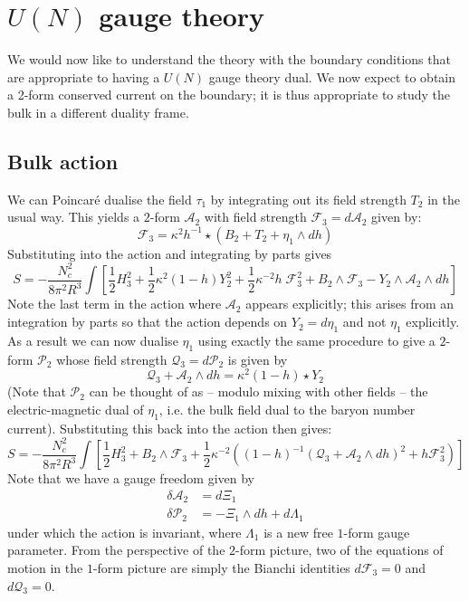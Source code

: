 \documentclass[aps,preprint,nofootinbib,preprintnumbers,eqsecnum,superscriptaddress]{revtex4}
\newcommand\sA{{\ensuremath{{\mathcal A}}}}
\newcommand\sP{{\mathcal P}}
\begin{document}
\section{\texorpdfstring{$U(N)$}{U(N)} gauge theory} \label{sec:U} 
We would now like to understand the theory with the boundary conditions that are appropriate to having a $U(N)$ gauge theory dual. We now expect to obtain a 2-form conserved current on the boundary; it is thus appropriate to study the bulk in a different duality frame. 

\subsection{Bulk action}
We can Poincar\'e dualise the field $\tau_1$ by integrating out its field strength $T_2$ in the usual way. This yields a $2$-form $\mathcal{A}_2$ with field strength $\mathcal{F}_{3} = d \mathcal{A}_2$ given by: 
\begin{equation}
	\mathcal{F}_3 = \kappa^2 h^{-1} \star \left(B_2 + T_2 + \eta_1 \wedge dh \right) \label{f3def} 
\end{equation}
Substituting into the action and integrating by parts gives
\begin{equation}
S = -\frac{N_c^2}{8 \pi^2 R^3}\int{\left[\frac{1}{2} H_3^2 + \frac{1}{2}\kappa^2 (1-h)Y_2^2 + \frac{1}{2} \kappa^{-2} h \; \mathcal{F}_3^2 + B_2 \wedge \mathcal{F}_3 - Y_2 \wedge \mathcal{A}_2 \wedge dh\right]}
\end{equation}
Note the last term in the action where $\sA_2$ appears explicitly; this arises from an integration by parts so that the action depends on $Y_2 = d\eta_1$ and not $\eta_1$ explicitly. As a result we can now dualise $\eta_1$ using exactly the same procedure to give a $2$-form $\mathcal{P}_2$ whose field strength $\mathcal{Q}_3 = d\mathcal{P}_2$ is given by 
\begin{equation}
	\mathcal{Q}_3 + \mathcal{A}_2 \wedge dh  = \kappa^2 (1-h) \star Y_2 \label{Q3def} 
\end{equation}
(Note that $\sP_2$ can be thought of as -- modulo mixing with other fields -- the electric-magnetic dual of $\eta_1$, i.e. the bulk field dual to the baryon number current). Substituting this back into the action then gives:	 
\begin{equation}
    S = -\frac{N_c^2}{8 \pi^2 R^3}\int{\left[\frac{1}{2} H_3^2 + B_2 \wedge \mathcal{F}_3 + \frac{1}{2} \kappa^{-2} \left( (1-h)^{-1} (\mathcal{Q}_3 + \mathcal{A}_2 \wedge dh)^2 + h \mathcal{F}_3^2\right) \right]}
\end{equation}
Note that we have a gauge freedom given by
\begin{subequations}
	\begin{align}
		\delta \mathcal{A}_2 & = d\Xi_1	\\
		\delta \mathcal{P}_2 & = - \Xi_1 \wedge dh + d\Lambda_1
	\end{align}
\end{subequations}
under which the action is invariant, where $\Lambda_1$ is a new free $1$-form gauge parameter. From the perspective of the $2$-form picture, two of the equations of motion in the $1$-form picture are simply the Bianchi identities $d \mathcal{F}_3 = 0$ and $d \mathcal{Q}_3 = 0$. 
\end{document}
